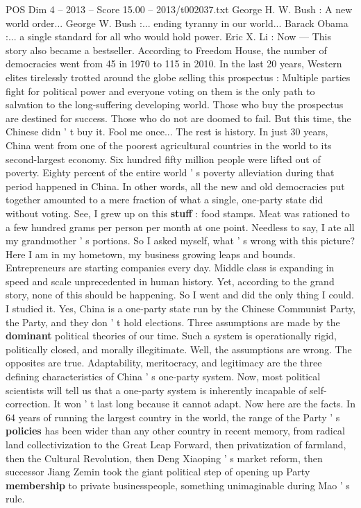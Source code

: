 \begin{textsample}{POS Dim 4 – 2013 – Score 15.00 – 2013/t002037.txt}
George H.
W.
Bush : A new world order...
George W.
Bush :... ending tyranny in our world...
Barack Obama :... a single standard for all who would hold power.
Eric X.
Li : Now — This story also became a bestseller.
According to Freedom House, the number of democracies went from 45 in 1970 to 115 in 2010.
In the last 20 years, Western elites tirelessly trotted around the globe selling this prospectus : Multiple parties fight for political power and everyone voting on them is the only path to salvation to the long-suffering developing world.
Those who buy the prospectus are destined for success.
Those who do not are doomed to fail.
But this time, the Chinese didn ' t buy it.
Fool me once...
The rest is history.
In just 30 years, China went from one of the poorest agricultural countries in the world to its second-largest economy.
Six hundred fifty million people were lifted out of poverty.
Eighty percent of the entire world ' s poverty alleviation during that period happened in China.
In other words, all the new and old democracies put together amounted to a mere fraction of what a single, one-party state did without voting.
See, I grew up on this \textbf{stuff} : food stamps.
Meat was rationed to a few hundred grams per person per month at one point.
Needless to say, I ate all my grandmother ' s portions.
So I asked myself, what ' s wrong with this picture?
Here I am in my hometown, my business growing leaps and bounds.
Entrepreneurs are starting companies every day.
Middle class is expanding in speed and scale unprecedented in human history.
Yet, according to the grand story, none of this should be happening.
So I went and did the only thing I could.
I studied it.
Yes, China is a one-party state run by the Chinese Communist Party, the Party, and they don ' t hold elections.
Three assumptions are made by the \textbf{dominant} political theories of our time.
Such a system is operationally rigid, politically closed, and morally illegitimate.
Well, the assumptions are wrong.
The opposites are true.
Adaptability, meritocracy, and legitimacy are the three defining characteristics of China ' s one-party system.
Now, most political scientists will tell us that a one-party system is inherently incapable of self- correction.
It won ' t last long because it cannot adapt.
Now here are the facts.
In 64 years of running the largest country in the world, the range of the Party ' s \textbf{policies} has been wider than any other country in recent memory, from radical land collectivization to the Great Leap Forward, then privatization of farmland, then the Cultural Revolution, then Deng Xiaoping ' s market reform, then successor Jiang Zemin took the giant political step of opening up Party \textbf{membership} to private businesspeople, something unimaginable during Mao ' s rule.

\end{textsample}
